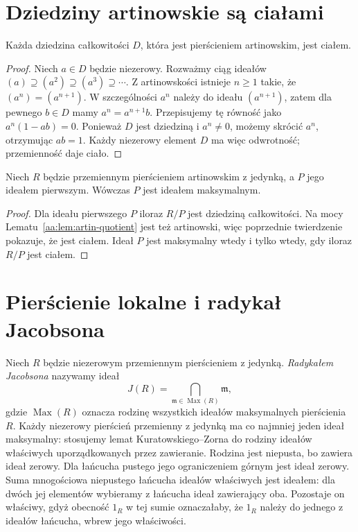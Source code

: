 \section{Dziedziny artinowskie są ciałami}
\begin{twierdzenie}
\label{aa:tw:artin-domain-field}
Każda dziedzina całkowitości $D$, która jest
pierścieniem artinowskim, jest ciałem.
\end{twierdzenie}
\begin{proof}
Niech $a\in D$ będzie niezerowy. Rozważmy ciąg
ideałów $(a)\supseteq(a^2)\supseteq(a^3)\supseteq\cdots$.
Z artinowskości istnieje $n\ge1$ takie, że
$(a^n)=(a^{n+1})$. W szczególności $a^n$ należy
do ideału $(a^{n+1})$, zatem dla pewnego $b\in D$
mamy $a^n=a^{n+1}b$. Przepisujemy tę równość jako
$a^n(1-ab)=0$. Ponieważ $D$ jest dziedziną i
$a^n\ne0$, możemy skrócić $a^n$, otrzymując
$ab=1$. Każdy niezerowy element $D$ ma więc
odwrotność; przemienność daje ciało.
\end{proof}

\begin{wniosek}
\label{aa:wn:artin-primes-maximal}
Niech $R$ będzie przemiennym pierścieniem artinowskim
z jedynką, a $P$ jego ideałem pierwszym.
Wówczas $P$ jest ideałem maksymalnym.
\end{wniosek}
\begin{proof}
Dla ideału pierwszego $P$ iloraz $R/P$ jest
dziedziną całkowitości. Na mocy
Lematu~\ref{aa:lem:artin-quotient} jest też artinowski,
więc poprzednie twierdzenie pokazuje, że jest ciałem.
Ideał $P$ jest maksymalny wtedy i tylko wtedy, gdy
iloraz $R/P$ jest ciałem.
\end{proof}

\section{Pierścienie lokalne i radykał Jacobsona}
\begin{definicja}
\label{aa:def:jacobson-radical}
Niech $R$ będzie niezerowym przemiennym pierścieniem
z jedynką. \emph{Radykałem Jacobsona} nazywamy ideał
\[
 J(R)=\bigcap_{\mathfrak m\in\operatorname{Max}(R)}\mathfrak m,
\]
gdzie $\operatorname{Max}(R)$ oznacza rodzinę wszystkich
ideałów maksymalnych pierścienia $R$.
Każdy niezerowy pierścień przemienny z jedynką ma co najmniej
jeden ideał maksymalny: stosujemy lemat Kuratowskiego--Zorna
do rodziny ideałów właściwych uporządkowanych przez zawieranie.
Rodzina jest niepusta, bo zawiera ideał zerowy. Dla
łańcucha pustego jego ograniczeniem górnym jest ideał
zerowy. Suma mnogościowa niepustego łańcucha ideałów
właściwych jest ideałem: dla dwóch jej elementów
wybieramy z łańcucha ideał zawierający oba. Pozostaje
on właściwy, gdyż obecność $1_R$ w tej sumie oznaczałaby,
że $1_R$ należy do jednego z ideałów łańcucha,
wbrew jego właściwości.
\end{definicja}

